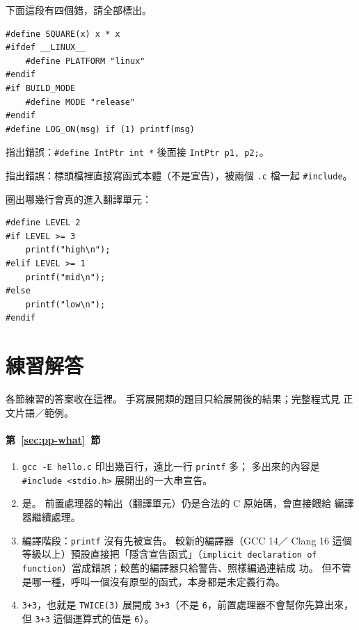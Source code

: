 \begin{drills}[label=drills:pp-checklist]
\item 下面這段有四個錯，請全部標出。
\begin{verbatim}
#define SQUARE(x) x * x
#ifdef __LINUX__
    #define PLATFORM "linux"
#endif
#if BUILD_MODE
    #define MODE "release"
#endif
#define LOG_ON(msg) if (1) printf(msg)
\end{verbatim}
\item 指出錯誤：\texttt{\#define IntPtr int *} 後面接
\texttt{IntPtr p1, p2;}。
\item 指出錯誤：標頭檔裡直接寫函式本體（不是宣告），被兩個 \texttt{.c}
檔一起 \texttt{\#include}。
\item 圈出哪幾行會真的進入翻譯單元：
\begin{verbatim}
#define LEVEL 2
#if LEVEL >= 3
    printf("high\n");
#elif LEVEL >= 1
    printf("mid\n");
#else
    printf("low\n");
#endif
\end{verbatim}
\end{drills}

{}
\section*{練習解答}

各節練習的答案收在這裡。 手寫展開類的題目只給展開後的結果；完整程式見
正文片語／範例。

\paragraph{第~\ref{sec:pp-what}~節}
\begin{enumerate}
\item \texttt{gcc -E hello.c} 印出幾百行，遠比一行 \texttt{printf} 多；
多出來的內容是 \texttt{\#include <stdio.h>} 展開出的一大串宣告。
\item 是。 前置處理器的輸出（翻譯單元）仍是合法的 C 原始碼，會直接餵給
編譯器繼續處理。
\item 編譯階段：\texttt{printf} 沒有先被宣告。 較新的編譯器（GCC 14／
Clang 16 這個等級以上）預設直接把「隱含宣告函式」（\texttt{implicit
declaration of function}）當成錯誤；較舊的編譯器只給警告、照樣編過連結成
功。 但不管是哪一種，呼叫一個沒有原型的函式，本身都是未定義行為。
\item \texttt{3+3}，也就是 \texttt{TWICE(3)} 展開成 \texttt{3+3}（不是
\texttt{6}，前置處理器不會幫你先算出來，但 \texttt{3+3} 這個運算式的值是
\texttt{6}）。
\end{enumerate}

